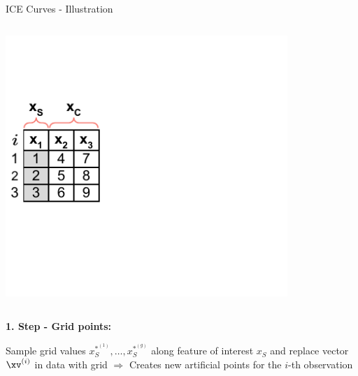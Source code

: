 \documentclass[11pt,compress,t,notes=noshow, aspectratio=169, xcolor=table]{beamer}
\begin{document}
\begin{frame}{ICE Curves - Illustration}

\begin{columns}[T]
\begin{column}{0.4\textwidth}
\includegraphics[page=2, trim=0cm 0.35cm 0.85cm 0.35cm, width=0.9\textwidth]{figure_man/ice_plot_demo}
\end{column}
\begin{column}{0.55\textwidth}

\end{column}
\end{columns}
\vspace*{\topsep}

\textbf{1. Step - Grid points:}

Sample grid values $x_S^{*^{(1)}}, \dots, x_S^{*^{(g)}}$ along feature of interest $x_S$
and replace vector $\xv^{(i)}$ in data with grid
\newline $\Rightarrow$ Creates new artificial points for the $i$-th observation

\end{frame}
\end{document}
